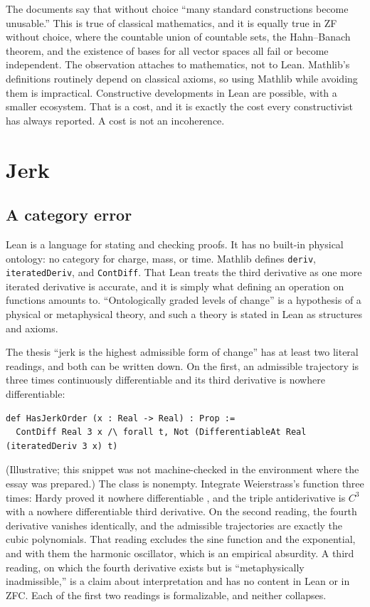 \documentclass[11pt]{article}
\begin{document}
The documents say that without choice ``many standard constructions become unusable.'' This is true of classical mathematics, and it is equally true in ZF without choice, where the countable union of countable sets, the Hahn--Banach theorem, and the existence of bases for all vector spaces all fail or become independent. The observation attaches to mathematics, not to Lean. Mathlib's definitions routinely depend on classical axioms, so using Mathlib while avoiding them is impractical. Constructive developments in Lean are possible, with a smaller ecosystem. That is a cost, and it is exactly the cost every constructivist has always reported. A cost is not an incoherence.

\section{Jerk}

\subsection{A category error}

Lean is a language for stating and checking proofs. It has no built-in physical ontology: no category for charge, mass, or time. Mathlib defines \texttt{deriv}, \texttt{iteratedDeriv}, and \texttt{ContDiff}. That Lean treats the third derivative as one more iterated derivative is accurate, and it is simply what defining an operation on functions amounts to. ``Ontologically graded levels of change'' is a hypothesis of a physical or metaphysical theory, and such a theory is stated in Lean as structures and axioms.

The thesis ``jerk is the highest admissible form of change'' has at least two literal readings, and both can be written down. On the first, an admissible trajectory is three times continuously differentiable and its third derivative is nowhere differentiable:
\begin{lstlisting}
def HasJerkOrder (x : Real -> Real) : Prop :=
  ContDiff Real 3 x /\ forall t, Not (DifferentiableAt Real (iteratedDeriv 3 x) t)
\end{lstlisting}
(Illustrative; this snippet was not machine-checked in the environment where the essay was prepared.) The class is nonempty. Integrate Weierstrass's function three times: Hardy proved it nowhere differentiable \cite{hardy1916}, and the triple antiderivative is $C^3$ with a nowhere differentiable third derivative. On the second reading, the fourth derivative vanishes identically, and the admissible trajectories are exactly the cubic polynomials. That reading excludes the sine function and the exponential, and with them the harmonic oscillator, which is an empirical absurdity. A third reading, on which the fourth derivative exists but is ``metaphysically inadmissible,'' is a claim about interpretation and has no content in Lean or in ZFC. Each of the first two readings is formalizable, and neither collapses.
\end{document}
